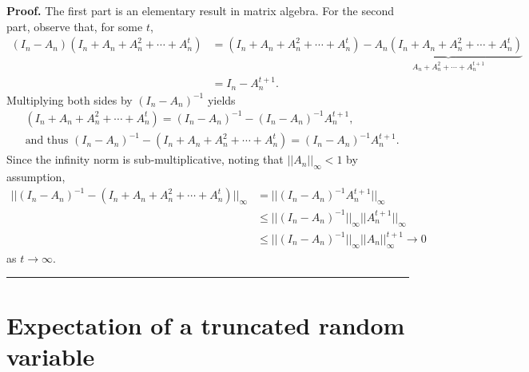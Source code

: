 \documentclass[10.5pt, A4paper, openany, uplatex]{book}
\newenvironment{proof}[1][Proof]{\textbf{#1.} }{\  \rule{0.5em}{0.5em}}
\numberwithin{equation}{section}
\begin{document}
\begin{appendices}
	\begin{proof}
		The first part is an elementary result in matrix algebra. 
		For the second part, observe that, for some $t$,
		\begin{align*}
		(I_n - A_n) (I_n + A_n + A_n^2 + \cdots + A_n^t) 
		& =  (I_n + A_n + A_n^2 + \cdots + A_n^t)  -  \underbrace{A_n (I_n + A_n + A_n^2 + \cdots + A_n^t) }_{A_n + A_n^2 + \cdots + A_n^{t+1}} \\
		& = I_n - A_n^{t+1}.
		\end{align*}
		Multiplying both sides by $(I_n - A_n)^{-1}$ yields
		\begin{align*}
		& (I_n + A_n + A_n^2 + \cdots + A_n^t)  =   (I_n - A_n)^{-1} - (I_n - A_n)^{-1}A_n^{t+1}, \\
		& \text{and thus } (I_n - A_n)^{-1} - (I_n + A_n + A_n^2 + \cdots + A_n^t) =  (I_n - A_n)^{-1}A_n^{t+1}.
		\end{align*}
		Since the infinity norm is sub-multiplicative, noting that $||A_n||_\infty < 1$ by assumption,
		\begin{align*}
		|| (I_n - A_n)^{-1} - (I_n + A_n + A_n^2 + \cdots + A_n^t)||_\infty 
		& =  ||(I_n - A_n)^{-1}A_n^{t+1}||_\infty \\
		& \le  ||(I_n - A_n)^{-1}||_\infty ||A_n^{t+1}||_\infty \\
		& \le  ||(I_n - A_n)^{-1}||_\infty ||A_n||^{t+1}_\infty \to 0
		\end{align*}
		as $t \to \infty$.
	\end{proof}
	
	\section{Expectation of a truncated random variable}\label{sec:truncate}
	

\end{appendices}
\end{document}
